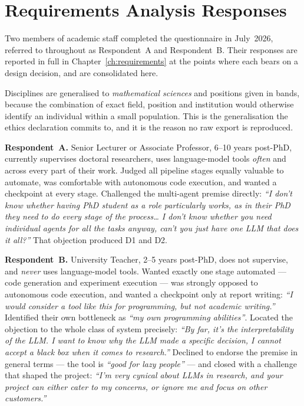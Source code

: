 \chapter{Requirements Analysis Responses}
\label{app:ra-responses}

Two members of academic staff completed the questionnaire in July~2026, referred
to throughout as Respondent~A and Respondent~B. Their responses are reported in
full in Chapter~\ref{ch:requirements} at the points where each bears on a design
decision, and are consolidated here.

Disciplines are generalised to \emph{mathematical sciences} and positions given
in bands, because the combination of exact field, position and institution would
otherwise identify an individual within a small population. This is the
generalisation the ethics declaration commits to, and it is the reason no raw
export is reproduced.

\textbf{Respondent~A.} Senior Lecturer or Associate Professor, 6--10 years
post-PhD, currently supervises doctoral researchers, uses language-model tools
\emph{often} and across every part of their work. Judged all pipeline stages
equally valuable to automate, was comfortable with autonomous code execution,
and wanted a checkpoint at every stage. Challenged the multi-agent premise
directly: \emph{``I don't know whether having PhD student as a role particularly
works, as in their PhD they need to do every stage of the process\ldots{} I don't
know whether you need individual agents for all the tasks anyway, can't you just
have one LLM that does it all?''} That objection produced D1 and D2.

\textbf{Respondent~B.} University Teacher, 2--5 years post-PhD, does not
supervise, and \emph{never} uses language-model tools. Wanted exactly one stage
automated --- code generation and experiment execution --- was strongly opposed
to autonomous code execution, and wanted a checkpoint only at report writing:
\emph{``I would consider a tool like this for programming, but not academic
writing.''} Identified their own bottleneck as \emph{``my own programming
abilities''}. Located the objection to the whole class of system precisely:
\emph{``By far, it's the interpretability of the LLM. I want to know why the LLM
made a specific decision, I cannot accept a black box when it comes to
research.''} Declined to endorse the premise in general terms --- the tool is
\emph{``good for lazy people''} --- and closed with a challenge that shaped the
project: \emph{``I'm very cynical about LLMs in research, and your project can
either cater to my concerns, or ignore me and focus on other customers.''}

